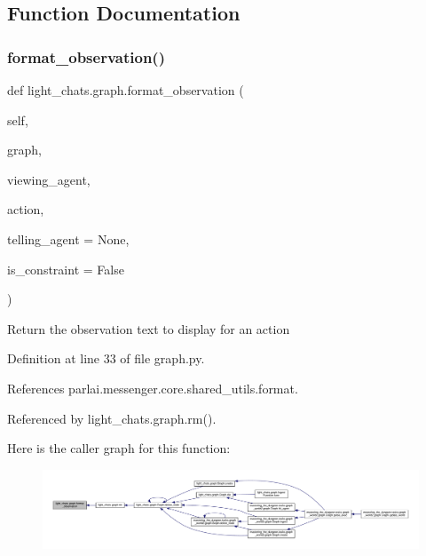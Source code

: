 \subsection{Function Documentation}
\mbox{\label{namespacelight__chats_1_1graph_a6d359942394976812f0055affc289f56}} 
\subsubsection{\texorpdfstring{format\+\_\+observation()}{format\_observation()}}
{\footnotesize\ttfamily def light\+\_\+chats.\+graph.\+format\+\_\+observation (\begin{DoxyParamCaption}\item[{}]{self,  }\item[{}]{graph,  }\item[{}]{viewing\+\_\+agent,  }\item[{}]{action,  }\item[{}]{telling\+\_\+agent = {\ttfamily None},  }\item[{}]{is\+\_\+constraint = {\ttfamily False} }\end{DoxyParamCaption})}

\begin{DoxyVerb}Return the observation text to display for an action\end{DoxyVerb}
 

Definition at line 33 of file graph.\+py.



References parlai.\+messenger.\+core.\+shared\+\_\+utils.\+format.



Referenced by light\+\_\+chats.\+graph.\+rm().

Here is the caller graph for this function\+:
\nopagebreak
\begin{figure}[H]
\begin{center}
\leavevmode
\includegraphics[width=350pt]{namespacelight__chats_1_1graph_a6d359942394976812f0055affc289f56_icgraph}
\end{center}
\end{figure}
\mbox{\label{namespacelight__chats_1_1graph_a76960b89046df1b0cda1de931fa1fd69}} 
